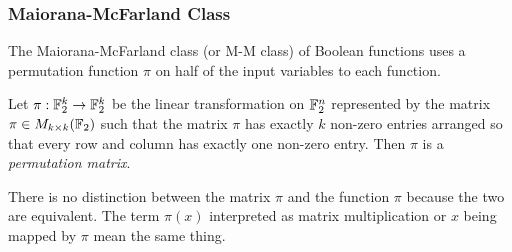 \subsubsection{Maiorana-McFarland Class}
\par The Maiorana-McFarland class (or M-M class) of Boolean functions uses a
permutation function $\pi$ on half of the input variables to each function.

\begin{definition}
  Let $\pi:\mathbb{F}_2^k\rightarrow\mathbb{F}_2^k$ be the linear transformation on
  $\mathbb{F}_2^n$ represented by the matrix $\pi\in M_{k\times k}(\mathbb{F}_2)$ such that the
  matrix $\pi$ has exactly $k$ non-zero entries arranged so that every row
  and column has exactly one non-zero entry. Then $\pi$ is a
  {\it permutation matrix}.
\end{definition}

\par There is no distinction between the matrix $\pi$ and the function $\pi$
because the two are equivalent. The term $\pi(x)$ interpreted as matrix
multiplication or $x$ being mapped by $\pi$ mean the same thing.

